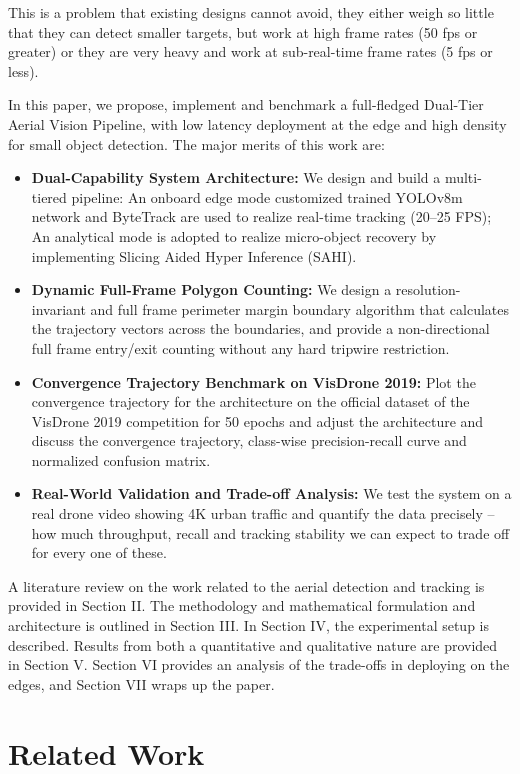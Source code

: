 \documentclass[conference]{IEEEtran}
\begin{document}
This is a problem that existing designs cannot avoid, they either weigh so little that they can detect smaller targets, but work at high frame rates (50 fps or greater) or they are very heavy and work at sub-real-time frame rates (5 fps or less).

In this paper, we propose, implement and benchmark a full-fledged Dual-Tier Aerial Vision Pipeline, with low latency deployment at the edge and high density for small object detection. The major merits of this work are:

\begin{itemize}
    \item \textbf{Dual-Capability System Architecture:} We design and build a multi-tiered pipeline: An onboard edge mode customized trained YOLOv8m network and ByteTrack are used to realize real-time tracking (20--25 FPS); An analytical mode is adopted to realize micro-object recovery by implementing Slicing Aided Hyper Inference (SAHI).
    \item \textbf{Dynamic Full-Frame Polygon Counting:} We design a resolution-invariant and full frame perimeter margin boundary algorithm that calculates the trajectory vectors across the boundaries, and provide a non-directional full frame entry/exit counting without any hard tripwire restriction.
    \item \textbf{Convergence Trajectory Benchmark on VisDrone 2019:} Plot the convergence trajectory for the architecture on the official dataset of the VisDrone 2019 competition for 50 epochs and adjust the architecture and discuss the convergence trajectory, class-wise precision-recall curve and normalized confusion matrix.
    \item \textbf{Real-World Validation and Trade-off Analysis:} We test the system on a real drone video showing 4K urban traffic and quantify the data precisely -- how much throughput, recall and tracking stability we can expect to trade off for every one of these.
\end{itemize}

A literature review on the work related to the aerial detection and tracking is provided in Section II. The methodology and mathematical formulation and architecture is outlined in Section III. In Section IV, the experimental setup is described. Results from both a quantitative and qualitative nature are provided in Section V. Section VI provides an analysis of the trade-offs in deploying on the edges, and Section VII wraps up the paper.

\section{Related Work}
\end{document}
